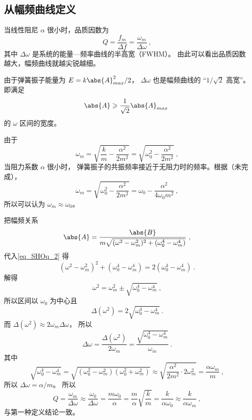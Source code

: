\subsection{从幅频曲线定义}
当线性阻尼 $\alpha$ 很小时，品质因数为
\begin{equation}
Q = \frac{f_m}{\Delta {f}} = \frac{\omega_m}{\Delta \omega}~,
\end{equation}
其中 $\Delta\omega$ 是系统的能量—频率曲线的半高宽（FWHM）。%
由此可以看出品质因数越大，幅频曲线就越尖锐越细。

由于弹簧振子能量为 $E = k\abs{A}_{max}^2/2$， $\Delta \omega$ 也是幅频曲线的 “$1/\sqrt{2}$ 高宽”。 即满足
\begin{equation}\label{eq_SHOq_2}
\abs{A} \geqslant \frac{1}{\sqrt{2}} \abs{A}_{max}~
\end{equation}
的 $\omega$ 区间的宽度。

由于
\begin{equation}
\omega_m = \sqrt{\frac{k}{m} - \frac{\alpha^2}{2m^2}} = \sqrt{\omega_0^2 - \frac{\alpha^2}{2m^2}}~,
\end{equation}
当阻力系数 $\alpha$ 很小时， 弹簧振子的共振频率接近于无阻力时的频率。根据（未完成），
\begin{equation}
\omega_m = \sqrt{\omega_0^2 - \frac{\alpha^2}{2m^2}} = \omega_0 - \frac{\alpha^2}{4\omega_0 m^2}~,
\end{equation}
所以可以认为 $\omega_m \approx \omega_0$。

把幅频关系
\begin{equation}
\abs{A} = \frac{\abs{B}}{m\sqrt{(\omega^2 - \omega_m^2)^2 + (\omega_0^4 - \omega_m^4)}}~,
\end{equation}
代入\autoref{eq_SHOq_2} 得
\begin{equation}
(\omega^2 - \omega_m^2)^2 + (\omega_0^4 - \omega_m^4) = 2(\omega_0^4 - \omega_m^4)~.
\end{equation}
解得
\begin{equation}
\omega^2 = \omega_m^2 \pm \sqrt{\omega_0^4 - \omega_m^4}~,
\end{equation}
所以区间以 $\omega_0$ 为中心且
\begin{equation}
\Delta(\omega^2) = 2\sqrt{\omega_0^4 - \omega_m^4}~.
\end{equation}
而 $\Delta(\omega^2) \approx 2\omega_m \Delta \omega$， 所以
\begin{equation}
\Delta \omega =  \frac{\Delta(\omega^2)}{2\omega_m} = \frac{\sqrt{\omega_0^4 - \omega_m^4}}{\omega_m}~.
\end{equation}
其中
\begin{equation}
\sqrt{\omega_0^4 - \omega_m^4} = \sqrt{(\omega_0^2 - \omega_m^2)(\omega_0^2 + \omega_m^2)}
\approx \sqrt{\frac{\alpha^2}{2m^2} \cdot 2\omega_m^2} = \frac{\alpha\omega_m}{m}~,
\end{equation}
所以 $\Delta \omega = {\alpha}/{m}$。 所以
\begin{equation}
Q = \frac{\omega_m}{\Delta \omega} \approx \frac{\omega_0}{\Delta \omega} = \frac{m\omega_0}{\alpha} = \frac{m}{\alpha} \sqrt{\frac{k}{m}} = \frac{k}{\alpha \omega_0}
\approx \frac{k}{\alpha\omega_m}~,
\end{equation}
与第一种定义结论一致。
